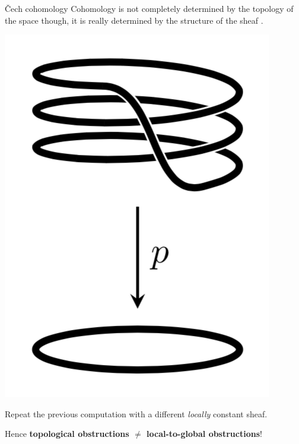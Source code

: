 \begin{frame}{\v{C}ech cohomology}
	Cohomology is not completely determined by the topology of the space though, it is really determined by the structure of the sheaf .
	\vfill
	\begin{example}
		\vspace{1.5ex}
		\begin{minipage}{.2\textwidth}
			\includegraphics[width=.8\columnwidth]{figures/s1_triple_covering.png}
		\end{minipage}
		\begin{minipage}{.7\textwidth}
			Repeat the previous computation with a different \emph{locally} constant sheaf.
		\end{minipage}
	\end{example}
	\vfill
	Hence \textbf{topological obstructions $\neq$ local-to-global obstructions}!
\end{frame}

